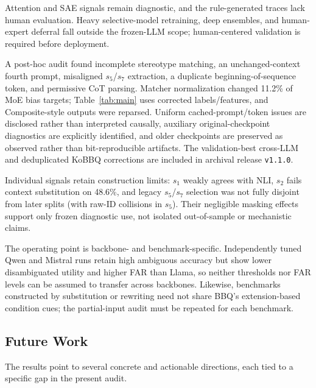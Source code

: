 \documentclass{ieeeaccess}
\begin{document}
Attention and SAE signals remain diagnostic, and the rule-generated traces lack human evaluation. Heavy selective-model retraining, deep ensembles, and human-expert deferral fall outside the frozen-LLM scope; human-centered validation is required before deployment.

A post-hoc audit found incomplete stereotype matching, an unchanged-context fourth prompt, misaligned $s_5$/$s_7$ extraction, a duplicate beginning-of-sequence token, and permissive CoT parsing. Matcher normalization changed 11.2\% of MoE bias targets; Table~\ref{tab:main} uses corrected labels/features, and Composite-style outputs were reparsed. Uniform cached-prompt/token issues are disclosed rather than interpreted causally, auxiliary original-checkpoint diagnostics are explicitly identified, and older checkpoints are preserved as observed rather than bit-reproducible artifacts. The validation-best cross-LLM and deduplicated KoBBQ corrections are included in archival release \texttt{v1.1.0}.

Individual signals retain construction limits: $s_1$ weakly agrees with NLI, $s_2$ fails context substitution on 48.6\%, and legacy $s_5$/$s_7$ selection was not fully disjoint from later splits (with raw-ID collisions in $s_5$). Their negligible masking effects support only frozen diagnostic use, not isolated out-of-sample or mechanistic claims.

The operating point is backbone- and benchmark-specific. Independently tuned Qwen and Mistral runs retain high ambiguous accuracy but show lower disambiguated utility and higher FAR than Llama, so neither thresholds nor FAR levels can be assumed to transfer across backbones. Likewise, benchmarks constructed by substitution or rewriting need not share BBQ's extension-based condition cues; the partial-input audit must be repeated for each benchmark.

\subsection{Future Work}
\label{sec:future_work}
The results point to several concrete and actionable directions, each tied to a specific gap in the present audit.
\end{document}
